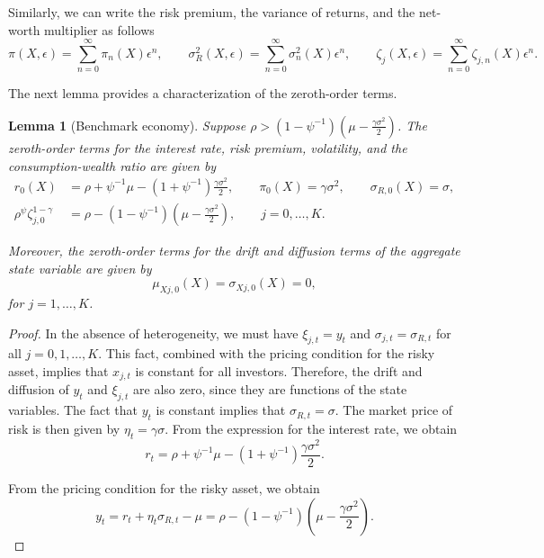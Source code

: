 \documentclass[11pt,english]{article}
\newtheorem{lemma}{Lemma}
\begin{document}
Similarly, we can write the risk premium, the variance of returns, and the net-worth multiplier as follows
\begin{equation}
    \pi(X,\epsilon) = \sum_{n=0}^\infty \pi_n(X) \epsilon^n, \qquad
    \sigma^2_R(X,\epsilon) = \sum_{n=0}^\infty \sigma^2_n(X)\epsilon^n, \qquad 
    \zeta_j(X,\epsilon) = \sum_{n=0}^\infty \zeta_{j,n}(X)\epsilon^n.
\end{equation}

The next lemma provides a characterization of the zeroth-order terms.

\begin{lemma}[Benchmark economy] Suppose $\rho > (1-\psi^{-1}) \left(\mu - \frac{\gamma \sigma^2}{2}\right) $. The zeroth-order terms for the interest rate, risk premium, volatility, and the consumption-wealth ratio are given by
\begin{align*}
    r_0(X) &= \rho + \psi^{-1} \mu -(1+\psi^{-1}) \frac{\gamma \sigma^2}{2}, \qquad
    \pi_0(X) = \gamma \sigma^2, \qquad
    \sigma_{R,0}(X) = \sigma,\\
    \rho^\psi \zeta_{j,0}^{1-\gamma} &= \rho -   (1-\psi^{-1}) \left(\mu - \frac{\gamma \sigma^2}{2}\right), \qquad j = 0, \ldots, K.
\end{align*}

Moreover, the zeroth-order terms for the drift and diffusion terms of the aggregate state variable are given by
\begin{equation}
    \mu_{Xj,0}(X) = \sigma_{Xj,0}(X) = 0,
\end{equation}
for $j = 1, \ldots, K$.  
\end{lemma}

\begin{proof}
In the absence of heterogeneity, we must have $\xi_{j,t} = y_t$ and $\sigma_{j,t} = \sigma_{R,t}$ for all $j=0,1,\ldots,K$. This fact, combined with the pricing condition for the risky asset, implies that $x_{j,t}$ is constant for all investors. Therefore, the drift and diffusion of $y_t$ and $\xi_{j,t}$ are also zero, since they are functions of the state variables. The fact that $y_t$ is constant implies that $\sigma_{R,t} = \sigma$. The market price of risk is then given by $\eta_t = \gamma \sigma$. From the expression for the interest rate, we obtain
\begin{equation*}
    r_t = \rho + \psi^{-1} \mu - (1+\psi^{-1})\frac{\gamma \sigma^2}{2}.
\end{equation*}

From the pricing condition for the risky asset, we obtain
\begin{equation}
    y_t = r_t + \eta_t \sigma_{R,t} - \mu = \rho -\left( 1 - \psi^{-1}\right) \left( \mu - \frac{\gamma \sigma^2}{2} \right).
\end{equation}
\end{proof}
\end{document}
